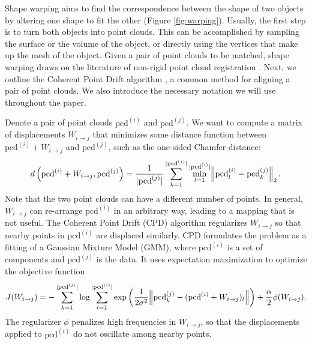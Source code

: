 \documentclass{article}
\newcommand{\rob}[1]{\textcolor{green}{[\textbf{rob:} #1]}}
\newcommand{\pcx}[1]{\mathrm{pcd}^{(#1)}}
\newcommand{\wxy}[2]{W_{#1 \rightarrow #2}}
\newcommand{\pci}{\pcx{i}}
\newcommand{\pcj}{\pcx{j}}
\newcommand{\wij}{\wxy{i}{j}}
\begin{document}
Shape warping aims to find the correspondence between the shape of two objects by altering one shape to fit the other (Figure \ref{fig:warping}). Usually, the first step is to turn both objects into point clouds. This can be accomplished by sampling the surface or the volume of the object, or directly using the vertices that make up the mesh of the object. Given a pair of point clouds to be matched, shape warping draws on the literature of non-rigid point cloud registration \cite{huang21comprehensive}. Next, we outline the Coherent Point Drift algorithm \cite{manuelli20keypoints}, a common method for aligning a pair of point clouds. We also introduce the necessary notation we will use throughout the paper.

Denote a pair of point clouds $\pci$ and $\pcj$. We want to compute a matrix of displacements $\wij$ that minimizes some distance function between $\pci + \wij$ and $\pcj$, such as the one-sided Chamfer distance:
\begin{align}
    d\left( \pci + \wij, \pcj \right) = \frac{1}{|\pcj|} \sum_{k=1}^{|\pcj|} \min_{l=1}^{|\pci|} \norm{ \pci_l - \pcj_k }_2.
\end{align}
Note that the two point clouds can have a different number of points. In general, $\wij$ can re-arrange $\pci$ in an arbitrary way, leading to a mapping that is not useful. The Coherent Point Drift (CPD) algorithm regularizes $\wij$ so that nearby points in $\pci$ are displaced similarly. CPD formulates the problem as a fitting of a Gaussian Mixture Model (GMM), where $\pci$ is a set of components and $\pcj$ is the data. It uses expectation maximization to optimize the objective function
\begin{align}
    J(\wij) = - \sum_{k=1}^{|\pcj|} \log \sum_{l=1}^{|\pci|} \exp \left( \frac{1}{2 \sigma^2} \norm{\pcj_k - (\pci + \wij)_l} \right) + \frac{\alpha}{2} \phi(\wij).
\end{align}
The regularizer $\phi$ penalizes high frequencies in $\wij$, so that the displacements applied to $\pci$ do not oscillate among nearby points.
\end{document}
